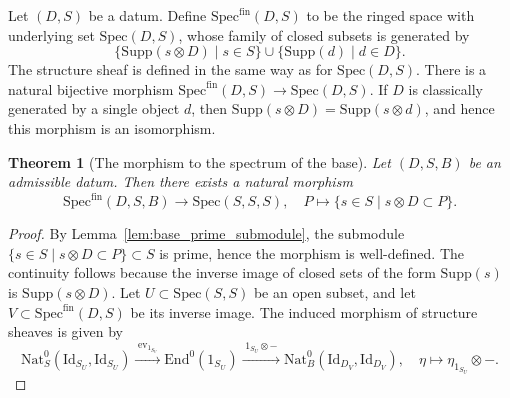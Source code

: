 \documentclass[11pt]{amsart}
\theoremstyle{definition}
\theoremstyle{plain}
\newtheorem{thm}[defn]{Theorem}
\theoremstyle{remark}
\newcommand{\Spec}{\mathrm{Spec}}
\newcommand{\mo}{\mathrm}
\newcommand{\Supp}{\mathrm{Supp}}
\newcommand{\Nat}{\mathrm{Nat}}
\newcommand{\Id}{\mathrm{Id}}
\newcommand{\End}{\mathrm{End}}
\newcommand{\fSpec}{{\mathrm{Spec}^{\mathrm{fin}}}}
\numberwithin{equation}{section}
\begin{document}
Let \((D,S)\) be a datum.
Define \(\fSpec(D,S)\) to be the ringed space with underlying set \(\Spec(D,S)\), whose family of closed subsets is generated by
\[
\{\Supp(s\otimes D)\mid s\in S\} \cup \{\Supp(d)\mid d\in D\}.
\]
The structure sheaf is defined in the same way as for \(\Spec(D,S)\).
There is a natural bijective morphism \(\fSpec(D,S)\to\Spec(D,S)\).
If \(D\) is classically generated by a single object \(d\), then \(\Supp(s\otimes D)=\Supp(s\otimes d)\), and hence this morphism is an isomorphism.

\begin{thm}[The morphism to the spectrum of the base]\label{thm:morphism_to_the_base}
Let \((D,S,B)\) be an admissible datum.
Then there exists a natural morphism
\[
\fSpec(D,S,B)\to \Spec(S,S,S), \quad 
P\longmapsto \{s\in S\mid s\otimes D\subset P\}.
\]
\end{thm}
\begin{proof}
  By Lemma~\ref{lem:base_prime_submodule}, the submodule \(\{s\in S\mid s\otimes D\subset P\}\subset S\) is prime, hence the morphism is well-defined.
  The continuity follows because the inverse image of closed sets of the form \(\Supp(s)\) is \(\Supp(s\otimes D)\).
  Let \(U\subset \Spec(S,S)\) be an open subset, and let \(V\subset \fSpec(D,S)\) be its inverse image.
  The induced morphism of structure sheaves is given by
  \[
  \Nat_S^0(\Id_{S_U},\Id_{S_U})
  \xrightarrow{\;\mo{ev}_{1_{S_U}}\;} \End^0(1_{S_U})
  \xrightarrow{\;1_{S_U}\otimes -\;} \Nat_B^0(\Id_{D_V},\Id_{D_V}),\quad
  \eta\mapsto \eta_{1_{S_U}}\otimes -.
  \]
\end{proof}
\end{document}
